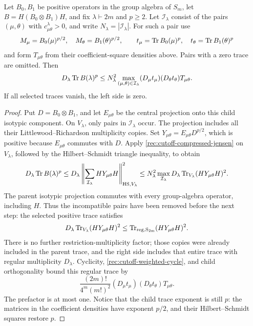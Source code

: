 \begin{lemma}\label{rec:cutoff-one-node}
Let $B_0,B_1$ be positive operators in the group algebra of $S_m$,
let $B=H(B_0\otimes B_1)H$, and fix $\lambda\vdash2m$ and $p\ge2$.
Let $\mathcal I_\lambda$ consist of the pairs $(\mu,\theta)$ with
$c_{\mu\theta}^\lambda>0$, and write $N_\lambda=|\mathcal I_\lambda|$.
For such a pair use
\[
 M_\mu=B_0(\mu)^{p/2},\quad M_\theta=B_1(\theta)^{p/2},\qquad
 t_\mu=\operatorname{Tr} B_0(\mu)^p,\quad t_\theta=\operatorname{Tr} B_1(\theta)^p
\]
and form $T_{\mu\theta}$ from their coefficient-square densities above.
Pairs with a zero trace are omitted.  Then
\begin{equation}\label{rec:cutoff-one-node-bound}
 D_\lambda\operatorname{Tr} B(\lambda)^p
 \le N_\lambda^2
       \max_{(\mu,\theta)\in\mathcal I_\lambda}
       (D_\mu t_\mu)(D_\theta t_\theta)T_{\mu\theta}.
\end{equation}
If all selected traces vanish, the left side is zero.
\end{lemma}
\begin{proof}
Put $D=B_0\otimes B_1$, and let $E_{\mu\theta}$ be the central
projection onto this child isotypic component.  On $V_\lambda$,
only pairs in $\mathcal I_\lambda$ occur.  The projection includes
all their Littlewood--Richardson multiplicity copies.  Set
$Y_{\mu\theta}=E_{\mu\theta}D^{p/2}$, which is positive because
$E_{\mu\theta}$ commutes with $D$.
Apply \eqref{rec:cutoff-compressed-jensen} on $V_\lambda$, followed
by the Hilbert--Schmidt triangle inequality, to obtain
\[
 D_\lambda\operatorname{Tr} B(\lambda)^p
 \le D_\lambda\left\|\sum_{\mathcal I_\lambda}
                   HY_{\mu\theta}H\right\|_{\mathrm{HS},V_\lambda}^{2}
 \le N_\lambda^2\max_{\mathcal I_\lambda}
                   D_\lambda\operatorname{Tr}_{V_\lambda}(HY_{\mu\theta}H)^2.
\]
The parent isotypic projection commutes with every group-algebra
operator, including $H$.  Thus the incompatible pairs have been removed
before the next step: the selected positive trace satisfies
\[
 D_\lambda\operatorname{Tr}_{V_\lambda}(HY_{\mu\theta}H)^2
 \le\operatorname{Tr}_{\rm reg,S_{2m}}(HY_{\mu\theta}H)^2.
\]
There is no further restriction-multiplicity factor; those copies were
already included in the parent trace, and the right side includes that
entire trace with regular multiplicity $D_\lambda$.
Cyclicity, \eqref{rec:cutoff-weighted-cycle}, and child orthogonality
bound this regular trace by
\[
 \frac{(2m)!}{4^m(m!)^2}
      (D_\mu t_\mu)(D_\theta t_\theta)T_{\mu\theta}.
\]
The prefactor is at most one.  Notice that the child trace exponent is
still $p$: the matrices in the coefficient densities have exponent $p/2$,
and their Hilbert--Schmidt squares restore $p$.
\end{proof}

